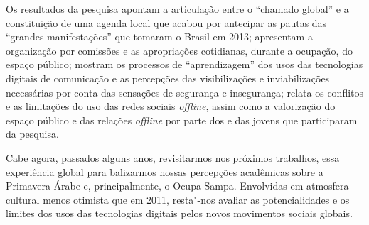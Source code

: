 Os resultados da pesquisa apontam a articulação entre o ``chamado
global'' e a constituição de uma agenda local que acabou por antecipar
as pautas das ``grandes manifestações'' que tomaram o Brasil em 2013;
apresentam a organização por comissões e as apropriações cotidianas,
durante a ocupação, do espaço público; mostram os processos de
``aprendizagem'' dos usos das tecnologias digitais de comunicação e as
percepções das visibilizações e inviabilizações necessárias por conta
das sensações de segurança e insegurança; relata os conflitos e as
limitações do uso das redes sociais \emph{\emph{offline}}, assim como a
valorização do espaço público e das relações \emph{\emph{offline}} por parte
dos e das jovens que participaram da pesquisa.

Cabe agora, passados alguns anos, revisitarmos nos próximos trabalhos,
essa experiência global para balizarmos nossas percepções acadêmicas
sobre a Primavera Árabe e, principalmente, o Ocupa Sampa. Envolvidas
em atmosfera cultural menos otimista que em 2011, resta"-nos avaliar as
potencialidades e os limites dos usos das tecnologias digitais pelos
novos movimentos sociais globais.


